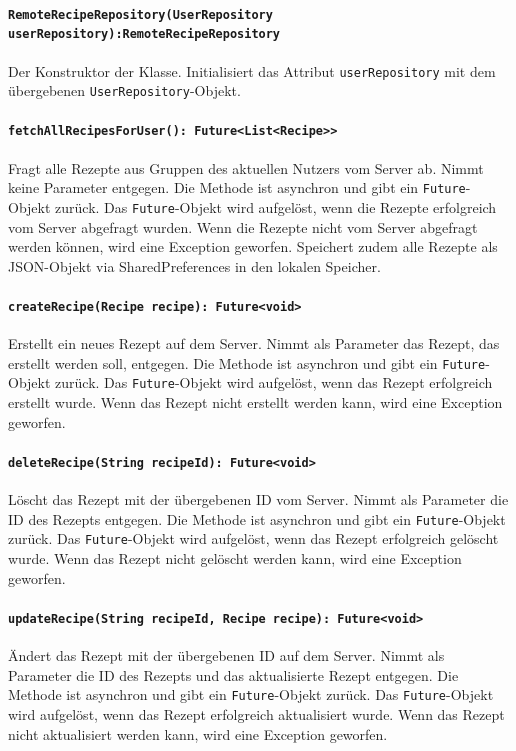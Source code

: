 \documentclass{entwurfsheft}
\begin{document}
\paragraph{\texttt{RemoteRecipeRepository(UserRepository userRepository):RemoteRecipeRepository\\}}
Der Konstruktor der Klasse. Initialisiert das Attribut \texttt{userRepository} mit dem übergebenen \texttt{UserRepository}-Objekt.
\paragraph{\texttt{fetchAllRecipesForUser(): Future<List<Recipe>>}}
Fragt alle Rezepte aus Gruppen des aktuellen Nutzers vom Server ab. Nimmt keine Parameter entgegen. Die Methode ist asynchron und gibt ein \texttt{Future}-Objekt zurück. Das \texttt{Future}-Objekt wird aufgelöst, wenn die Rezepte erfolgreich vom Server abgefragt wurden. Wenn die Rezepte nicht vom Server abgefragt werden können, wird eine Exception geworfen. Speichert zudem alle Rezepte als JSON-Objekt via \Gls{SharedPreferences} in den lokalen Speicher.
\paragraph{\texttt{createRecipe(Recipe recipe): Future<void>}}
Erstellt ein neues Rezept auf dem Server. Nimmt als Parameter das Rezept, das erstellt werden soll, entgegen. Die Methode ist asynchron und gibt ein \texttt{Future}-Objekt zurück. Das \texttt{Future}-Objekt wird aufgelöst, wenn das Rezept erfolgreich erstellt wurde. Wenn das Rezept nicht erstellt werden kann, wird eine Exception geworfen.
\paragraph{\texttt{deleteRecipe(String recipeId): Future<void>}}
Löscht das Rezept mit der übergebenen ID vom Server. Nimmt als Parameter die ID des Rezepts entgegen. Die Methode ist asynchron und gibt ein \texttt{Future}-Objekt zurück. Das \texttt{Future}-Objekt wird aufgelöst, wenn das Rezept erfolgreich gelöscht wurde. Wenn das Rezept nicht gelöscht werden kann, wird eine Exception geworfen.
\paragraph{\texttt{updateRecipe(String recipeId, Recipe recipe): Future<void>}}
Ändert das Rezept mit der übergebenen ID auf dem Server. Nimmt als Parameter die ID des Rezepts und das aktualisierte Rezept entgegen. Die Methode ist asynchron und gibt ein \texttt{Future}-Objekt zurück. Das \texttt{Future}-Objekt wird aufgelöst, wenn das Rezept erfolgreich aktualisiert wurde. Wenn das Rezept nicht aktualisiert werden kann, wird eine Exception geworfen.
\end{document}
